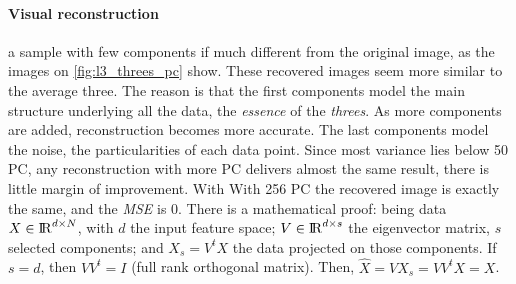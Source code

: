 \documentclass[a4paper, 10pt]{article}
\begin{document}
  \paragraph{Visual reconstruction} a sample with few components 
  if much different from the original image, as the images on 
  \autoref{fig:l3_threes_pc} show. These recovered images seem more similar 
  to the average three. %
  The reason is that the first components model the main structure underlying 
  all the data, the \emph{essence} of the \emph{threes}.
  As more components are added, reconstruction becomes more accurate.  The last 
  components model the noise, the particularities of each data point. Since
  most variance lies below 50 PC, any reconstruction with more PC delivers
  almost the same result, there is little margin of improvement. With
  With 256 PC the recovered image is exactly the same, and the \emph{MSE} is 0.
  There is a mathematical proof: being data $X \in {\rm I\!R}^{d \times N}$,
  with $d$ the input feature space; $V \in {\rm I\!R}^{d \times s}$ the
  eigenvector matrix, $s$ selected components; and $X_s=V^{t}X$ the data
  projected on those components. If $s=d$, then $VV^{t}=I$ (full rank orthogonal matrix).
  Then, $\hat{X} = VX_s = VV^{t}X = X$. 
  
\end{document}
